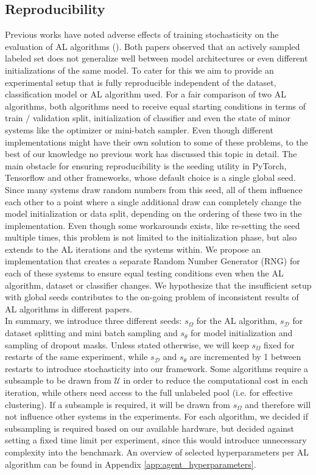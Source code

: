 \documentclass[]{article}
\begin{document}
\subsection{Reproducibility}\label{sec:reproducibility}
Previous works have noted adverse effects of training stochasticity on the evaluation of AL algorithms (\cite{zhou2021towards, lowell2018practical}).
Both papers observed that an actively sampled labeled set does not generalize well between model architectures or even different initializations of the same model.
To cater for this we aim to provide an experimental setup that is fully reproducible independent of the dataset, classification model or AL algorithm used.
For a fair comparison of two AL algorithms, both algorithms need to receive equal starting conditions in terms of train / validation split, initialization of classifier and even the state of minor systems like the optimizer or mini-batch sampler.
Even though different implementations might have their own solution to some of these problems, to the best of our knowledge no previous work has discussed this topic in detail.
The main obstacle for ensuring reproducibility is the seeding utility in PyTorch, Tensorflow and other frameworks, whose default choice is a single global seed.
Since many systems draw random numbers from this seed, all of them influence each other to a point where a single additional draw can completely change the model initialization or data split, depending on the ordering of these two in the implementation.
Even though some workarounds exists, like re-setting the seed multiple times, this problem is not limited to the initialization phase, but also extends to the AL iterations and the systems within.
We propose an implementation that creates a separate Random Number Generator (RNG) for each of these systems to ensure equal testing conditions even when the AL algorithm, dataset or classifier changes.
We hypothesize that the insufficient setup with global seeds contributes to the on-going problem of inconsistent results of AL algorithms in different papers. \\ [1mm]
In summary, we introduce three different seeds: $s_\Omega$ for the AL algorithm, $s_\mathcal{D}$ for dataset splitting and mini batch sampling and $s_\theta$ for model initialization and sampling of dropout masks.
Unless stated otherwise, we will keep $s_\Omega$ fixed for restarts of the same experiment, while $s_\mathcal{D}$ and $s_\theta$ are incremented by 1 between restarts to introduce stochasticity into our framework.
Some algorithms require a subsample to be drawn from $\mathcal{U}$ in order to reduce the computational cost in each iteration, while others need access to the full unlabeled pool (i.e. for effective clustering).
If a subsample is required, it will be drawn from $s_\Omega$ and therefore will not influence other systems in the experiments.
For each algorithm, we decided if subsampling is required based on our available hardware, but decided against setting a fixed time limit per experiment, since this would introduce unnecessary complexity into the benchmark.
An overview of selected hyperparameters per AL algorithm can be found in Appendix \ref{app:agent_hyperparameters}.
\end{document}
